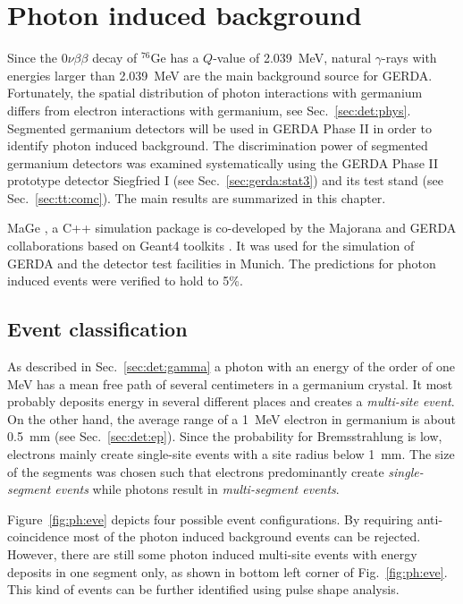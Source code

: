 \chapter{Photon induced background}
\label{cha:photon}
Since the $0\nu\beta\beta$ decay of $^{76}$Ge has a $Q$-value of 2.039~MeV, natural $\gamma$-rays with energies larger than 2.039~MeV are the main background source for GERDA. Fortunately, the spatial distribution of photon interactions with germanium differs from electron interactions with germanium, see Sec.~\ref{sec:det:phys}. Segmented germanium detectors will be used in GERDA Phase II in order to identify photon induced background. The discrimination power of segmented germanium detectors was examined systematically \cite{Pid07} using the GERDA Phase II prototype detector Siegfried I (see Sec.~\ref{sec:gerda:stat3}) and its test stand (see Sec.~\ref{sec:tt:comc}). The main results are summarized in this chapter. 

MaGe \cite{Mag06, Mag08}, a C++ simulation package is co-developed by the Majorana and GERDA collaborations based on Geant4 toolkits \cite{Gea03, Gea06}. It was used for the simulation of GERDA and the detector test facilities in Munich. The predictions for photon induced events were verified to hold to 5\%.

\section{Event classification}
\label{sec:ph:eve}
As described in Sec.~\ref{sec:det:gamma} a photon with an energy of the order of one MeV has a mean free path of several centimeters in a germanium crystal. It most probably deposits energy in several different places and creates a \emph{multi-site event}. On the other hand, the average range of a 1~MeV electron in germanium is about 0.5~mm (see Sec.~\ref{sec:det:ep}). Since the probability for Bremsstrahlung is low, electrons mainly create single-site events with a site radius below 1~mm. The size of the segments was chosen such that electrons predominantly create \emph{single-segment events} while photons result in \emph{multi-segment events}.

Figure~\ref{fig:ph:eve} depicts four possible event configurations. By requiring anti-coincidence most of the photon induced background events can be rejected. However, there are still some photon induced multi-site events with energy deposits in one segment only, as shown in bottom left corner of Fig.~\ref{fig:ph:eve}. This kind of events can be further identified using pulse shape analysis. 

